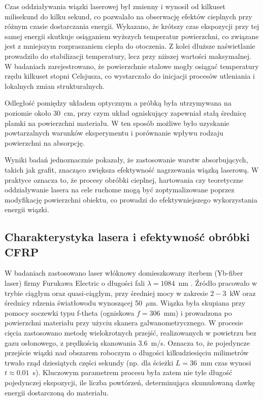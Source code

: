 \documentclass[a4paper,twoside,12pt]{book}
\begin{document}
Czas oddziaływania wiązki laserowej był zmienny i wynosił od kilkuset milisekund do kilku sekund, co pozwalało na obserwację efektów cieplnych przy różnym czasie dostarczania energii. Wykazano, że krótszy czas ekspozycji przy tej samej energii skutkuje osiąganiem wyższych temperatur powierzchni, co związane jest z mniejszym rozpraszaniem ciepła do otoczenia. Z kolei dłuższe naświetlanie prowadziło do stabilizacji temperatury, lecz przy niższej wartości maksymalnej. W badaniach zarejestrowano, że powierzchnie stalowe mogły osiągać temperatury rzędu kilkuset stopni Celsjusza, co wystarczało do inicjacji procesów utleniania i lokalnych zmian strukturalnych.

Odległość pomiędzy układem optycznym a próbką była utrzymywana na poziomie około 30~cm, przy czym układ ogniskujący zapewniał stałą średnicę plamki na powierzchni materiału. W ten sposób możliwe było uzyskanie powtarzalnych warunków eksperymentu i porównanie wpływu rodzaju powierzchni na absorpcję.

Wyniki badań jednoznacznie pokazały, że zastosowanie warstw absorbujących, takich jak grafit, znacząco zwiększa efektywność nagrzewania wiązką laserową. W praktyce oznacza to, że procesy obróbki cieplnej, hartowania czy teoretyczne oddziaływanie lasera na cele ruchome mogą być zoptymalizowane poprzez modyfikację powierzchni obiektu, co prowadzi do efektywniejszego wykorzystania energii wiązki.


\subsection*{Charakterystyka lasera i efektywność obróbki CFRP}

W badaniach zastosowano laser włóknowy domieszkowany iterbem (Yb-fiber laser) firmy Furukawa Electric o długości fali $\lambda = 1084$~nm \cite{bib:niino2016laser}. Źródło pracowało w trybie ciągłym oraz quasi-ciągłym, przy średniej mocy w zakresie $2{-}3$~kW oraz średnicy rdzenia światłowodu wynoszącej 50~$\mu$m. Wiązka była skupiana przy pomocy soczewki typu f-theta (ogniskowa $f=306$~mm) i prowadzona po powierzchni materiału przy użyciu skanera galwanometrycznego. W procesie cięcia zastosowano metodę wielokrotnych przejść, realizowanych w powietrzu bez gazu osłonowego, z prędkością skanowania $3.6$~m/s. Oznacza to, że pojedyncze przejście wiązki nad obszarem roboczym o długości kilkudziesięciu milimetrów trwało rząd dziesiątych części sekundy (np. dla ścieżki $L=36$~mm czas wynosi $t \approx 0.01$~s). Kluczowym parametrem procesu była zatem nie tyle długość pojedynczej ekspozycji, ile liczba powtórzeń, determinująca skumulowaną dawkę energii dostarczoną do materiału.
\end{document}
